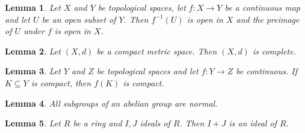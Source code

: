 \documentclass{article}
\newtheorem{lemma}{Lemma}
\begin{document}
\begin{lemma}\label{preimages}
Let $X$ and $Y$ be topological spaces, let $f\colon X\to Y$ be a continuous map and let $U$ be an open subset of $Y$. Then $f^{-1}(U)$ is open in $X$ and the preimage of $U$ under $f$ is open in $X$.
\end{lemma}

\begin{lemma}\label{spaces-as-pairs}
Let $(X,d)$ be a compact metric space. Then $(X,d)$ is complete.
\end{lemma}

\begin{lemma}\label{subsets-in-hypotheses}
Let $Y$ and $Z$ be topological spaces and let $f\colon Y\to Z$ be continuous. If $K\subseteq Y$ is compact, then $f(K)$ is compact.
\end{lemma}

\begin{lemma}\label{all-subgroups}
All subgroups of an abelian group are normal.
\end{lemma}

\begin{lemma}\label{plural-without-be}
Let $R$ be a ring and $I,J$ ideals of $R$. Then $I+J$ is an ideal of $R$.
\end{lemma}
\end{document}
